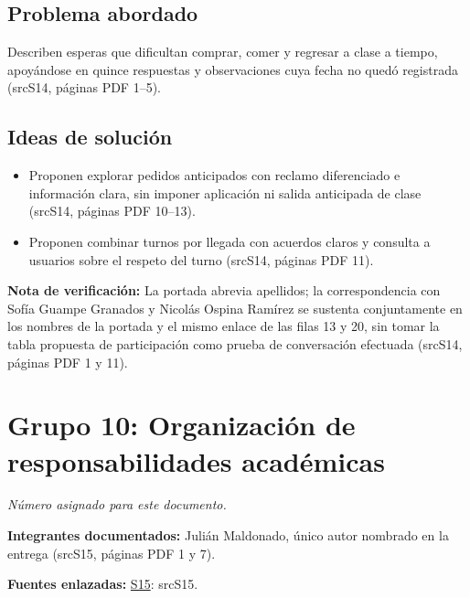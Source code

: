\documentclass[11pt,a4paper]{article}
\newcommand{\evid}[2]{(\csname src#1\endcsname, páginas PDF #2)}
\begin{document}
\subsection*{Problema abordado}
Describen esperas que dificultan comprar, comer y regresar a clase a tiempo, apoyándose en quince respuestas y observaciones cuya fecha no quedó registrada \evid{S14}{1--5}.
\subsection*{Ideas de solución}
\begin{itemize}
\item Proponen explorar pedidos anticipados con reclamo diferenciado e información clara, sin imponer aplicación ni salida anticipada de clase \evid{S14}{10--13}.
\item Proponen combinar turnos por llegada con acuerdos claros y consulta a usuarios sobre el respeto del turno \evid{S14}{11}.
\end{itemize}
{\small\textbf{Nota de verificación:} La portada abrevia apellidos; la correspondencia con Sofía Guampe Granados y Nicolás Ospina Ramírez se sustenta conjuntamente en los nombres de la portada y el mismo enlace de las filas 13 y 20, sin tomar la tabla propuesta de participación como prueba de conversación efectuada \evid{S14}{1 y 11}.}
\clearpage
\section*{Grupo 10: Organización de responsabilidades académicas}
\textit{Número asignado para este documento.}

\textbf{Integrantes documentados:} Julián Maldonado, único autor nombrado en la entrega \evid{S15}{1 y 7}.

\textbf{Fuentes enlazadas:} \hyperlink{fuente-S15}{S15}: \csname srcS15\endcsname.
\end{document}
